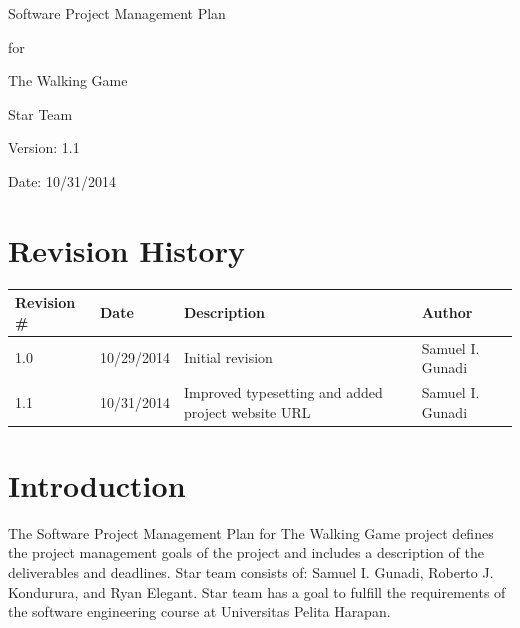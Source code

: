 \documentclass[12pt,letterpaper]{article}
\begin{document}
	\vspace*{2.8 in}
	\begin{huge}
		\begin{center}
			Software Project Management Plan
			\par
			for
			\par
			The Walking Game
			\par
		\end{center}
	\end{huge}
	\vspace*{2.5 in}
	\begin{large}
		\begin{flushright}
			Star Team
			
			Version: 1.1
			
			Date: 10/31/2014
		\end{flushright}
	\end{large}
	
	\clearpage
	\section*{Revision History}
	\begin{flushleft}
		\begin{tabular}{|p{0.855in}|p{0.8in}|p{2.7in}|p{1.298in}|}
			\hline
			\textbf{Revision \#} & \textbf{Date} & \textbf{Description} & \textbf{Author} \\\hline
			1.0 & 10/29/2014 & Initial revision & Samuel I. Gunadi \\\hline
			1.1 & 10/31/2014 & Improved typesetting and added project website URL & Samuel I. Gunadi \\\hline
		\end{tabular}
	\end{flushleft}
	\clearpage
	\bigskip
	\tableofcontents
	
	\clearpage
	\bigskip
	\listoftables
	
	\clearpage
	\bigskip
	\listoffigures
	
	\clearpage
	\setcounter{page}{0}
	
	\section{Introduction}
	The Software Project Management Plan for The Walking Game project defines the project management goals of the project and includes a description of the deliverables and deadlines. Star team consists of: Samuel I. Gunadi, Roberto J. Kondurura, and Ryan Elegant. Star team has a goal to fulfill the requirements of the software engineering course at Universitas Pelita Harapan.
	
\end{document}
